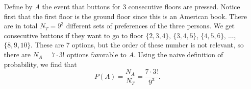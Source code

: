 
\setcounter{theorem}{22}
\begin{exercise}[BH.1.23]
\begin{solution}
    Define by $A$ the event that buttons for 3 consecutive floors are pressed. Notice first that the first floor is the ground floor since this is an American book. There are in total $N_{T}=9^3$ different sets of preferences of the three persons. We get consecutive buttons if they want to go to floor $\{2,3,4\}$, $\{3,4,5\}$, $\{4,5,6\}$, $\ldots$, $\{8,9,10\}$. These are 7 options, but the order of these number is not relevant, so there are $N_{A}=7\cdot 3!$ options favorable to $A$. Using the naive definition of probability, we find that $$P(A) = \frac{N_{A}}{N_{T}} = \frac{7\cdot 3!}{9^3}.$$
\end{solution}
\end{exercise}


